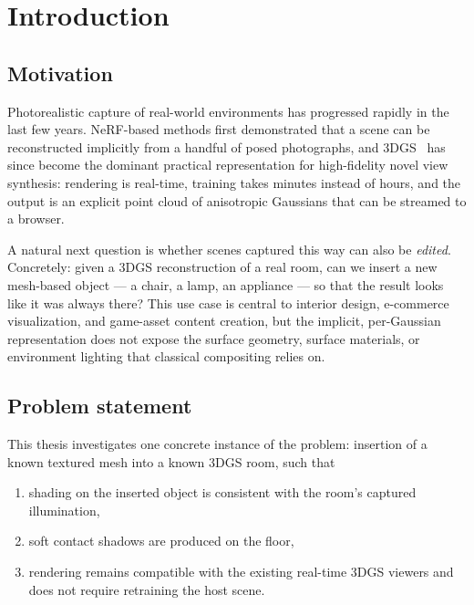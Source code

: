 
\chapter{Introduction}\label{chapter:introduction}

\section{Motivation}

Photorealistic capture of real-world environments has progressed rapidly in
the last few years. \ac{NeRF}-based methods first demonstrated that a scene
can be reconstructed implicitly from a handful of posed photographs, and
\ac{3DGS}~\parencite{kerbl3Dgaussians} has since become the dominant
practical representation for high-fidelity novel view synthesis: rendering
is real-time, training takes minutes instead of hours, and the output is an
explicit point cloud of anisotropic Gaussians that can be streamed to a
browser.

A natural next question is whether scenes captured this way can also be
\emph{edited}. Concretely: given a 3DGS reconstruction of a real room, can
we insert a new mesh-based object --- a chair, a lamp, an appliance --- so
that the result looks like it was always there? This use case is central to
interior design, e-commerce visualization, and game-asset content creation,
but the implicit, per-Gaussian representation does not expose the surface
geometry, surface materials, or environment lighting that classical
compositing relies on.

\section{Problem statement}

This thesis investigates one concrete instance of the problem: insertion of
a known textured mesh into a known 3DGS room, such that
\begin{enumerate}
  \item shading on the inserted object is consistent with the room's
        captured illumination,
  \item soft contact shadows are produced on the floor,
  \item rendering remains compatible with the existing real-time 3DGS
        viewers and does not require retraining the host scene.
\end{enumerate}

